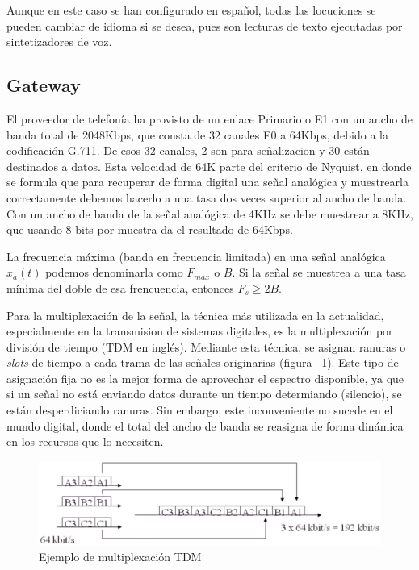 \documentclass[a4paper, 12pt]{book}
\begin{document}
Aunque en este caso se han configurado en español, todas las locuciones se pueden cambiar de idioma si se desea, pues son lecturas de texto ejecutadas por sintetizadores de voz.

\subsection{Gateway}
\label{sec:gateway}

El proveedor de telefonía ha provisto de un enlace Primario o E1 con un ancho de banda total de 2048Kbps, que consta de 32 canales E0 a 64Kbps, debido a la codificación G.711. De esos 32 canales, 2 son para señalizacion y 30 están destinados a datos. 
Esta velocidad de 64K parte del criterio de Nyquist, en donde se formula que para recuperar de forma digital una señal analógica y muestrearla correctamente debemos hacerlo a una tasa dos veces superior al ancho de banda. 
Con un ancho de banda de la señal analógica de 4KHz se debe muestrear a 8KHz, que usando 8 bits por muestra da el resultado de 64Kbps.

La frecuencia máxima (banda en frecuencia limitada) en una señal analógica $x_{a}(t)$ podemos denominarla como $F_{max}$  o $B$. Si la señal se muestrea a una tasa mínima del doble de esa frencuencia, entonces $F_{s} \geq 2B$.

Para la multiplexación de la señal, la técnica más utilizada en la actualidad, especialmente en la transmision de sistemas digitales, es la multiplexación por división de tiempo (TDM en inglés). Mediante esta técnica, se asignan ranuras o \emph{slots} de tiempo a cada trama de las señales originarias (figura ~\ref{figura:fig_tdm}). Este tipo de asignación fija no es la mejor forma de aprovechar el espectro disponible, ya que si un señal no está enviando datos durante un tiempo determiando (silencio), se están desperdiciando ranuras. Sin embargo, este inconveniente no sucede en el mundo digital, donde el total del ancho de banda se reasigna de forma dinámica en los recursos que lo necesiten.

\begin{figure}
  \centering
  \includegraphics[scale=0.7]{img/fig_tdm}
  \caption{Ejemplo de multiplexación TDM}
  \label{figura:fig_tdm}
\end{figure}
\end{document}
